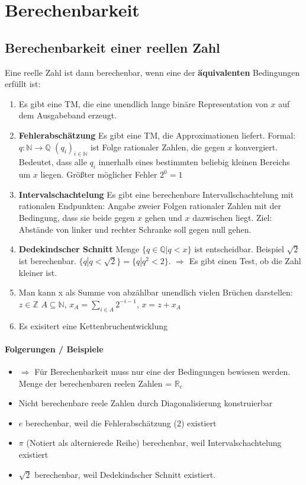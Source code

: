 \documentclass[ngerman]{scrartcl}
\begin{document}
\section{Berechenbarkeit} 

\subsection{Berechenbarkeit einer reellen Zahl}
Eine reelle Zahl ist dann berechenbar, wenn eine der \textbf{äquivalenten} Bedingungen erfüllt ist:
\begin{enumerate}
  \item Es gibt eine TM, die eine unendlich lange binäre Representation von $ x $ auf dem Ausgabeband erzeugt.  
  \item \textbf{Fehlerabschätzung} Es gibt eine TM, die Approximationen liefert. Formal: $ q:\mathbb{N}\rightarrow \mathbb{Q} $ $ (q_{i})_{i \in \mathbb{N}} $ ist Folge rationaler Zahlen, die gegen $ x $ konvergiert. Bedeutet, dass alle $ q_i $ innerhalb eines bestimmten beliebig kleinen Bereichs um $ x $ liegen. Größter möglicher Fehler $ 2^0 = 1 $
  \item \textbf{Intervalschachtelung} Es gibt eine berechenbare Intervallschachtelung mit rationalen Endpunkten: Angabe zweier Folgen rationaler Zahlen mit der Bedingung, dass sie beide gegen $ x $ gehen und $ x $ dazwischen liegt. Ziel: Abstände von linker und rechter Schranke soll gegen null gehen.
  \item \textbf{Dedekindscher Schnitt} Menge $ \{q \in \mathbb{Q} | q < x \} $ ist entscheidbar. Beispiel $ \sqrt{2} $ ist berechenbar. $ \{ q | q < \sqrt{2} \} = \{ q | q^2 < 2\}$. $ \Rightarrow $ Es gibt einen Test, ob die Zahl kleiner ist.
  \item Man kann x als Summe von abzählbar unendlich vielen Brüchen darstellen: $ z \in \mathbb{Z} $ $ A \subseteq \mathbb{N} $, $ x_A = \sum_{i \in A} 2^{-i-1} $, $ x = z + x_A $
  \item Es exisitert eine Kettenbruchentwicklung
 \end{enumerate}
 \paragraph{Folgerungen / Beispiele}
\begin{itemize}
  \item $ \Rightarrow $ Für Berechenbarkeit muss nur eine der Bedingungen bewiesen werden. Menge der berechenbaren reelen Zahlen = $ \mathbb{R}_c $
  \item Nicht berechenbare reele Zahlen durch Diagonalisierung konstruierbar
  \item $ e $ berechenbar, weil die Fehlerabschätzung (2) existiert
  \item $ \pi $ (Notiert als alternierede Reihe) berechenbar, weil Intervalschachtelung existiert
  \item $ \sqrt{2} $ berechenbar, weil Dedekindscher Schnitt existiert.
 \end{itemize}
\end{document}
